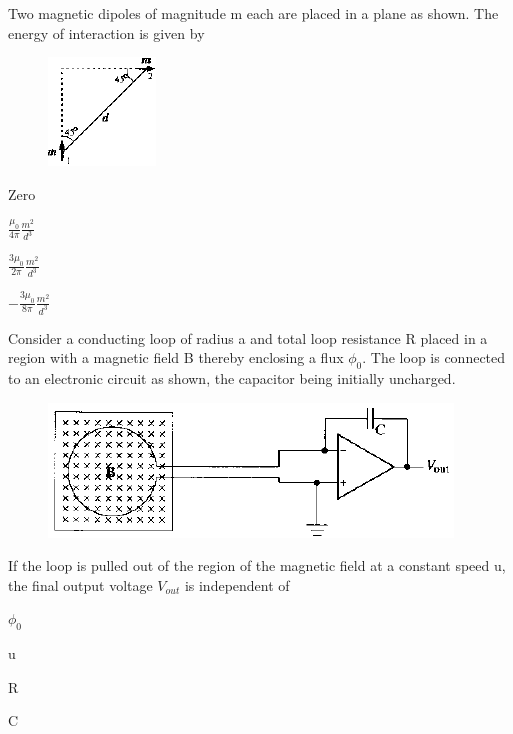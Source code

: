 \documentclass{exam}
\begin{document}
\begin{questions}
\question Two magnetic dipoles of magnitude m each are placed in a plane as shown. The energy of interaction is given by\hfill{}
	\begin{figure}[H] \centering
		\caption*{} \label{38} \includegraphics[width=0.1\columnwidth]{pics/38.png}
	\end{figure}


\begin{enumerate} \begin{multicols}{4}
	\item Zero \item $\frac{\mu_{0}}{4\pi}\frac{m^{2}}{d^{3}}$ \item $\frac{3\mu_{0}}{2\pi}\frac{m^{2}}{d^{3}}$ \item $-\frac{3\mu_{0}}{8\pi}\frac{m^{2}}{d^{3}}$
\end{multicols} \end{enumerate}

\question Consider a conducting loop of radius a and total loop resistance R placed in a region with a magnetic field B thereby enclosing a flux $\phi_0$. The loop is connected to an electronic circuit as shown, the capacitor being initially uncharged.
	\begin{figure}[H]
	\centering
		\caption*{} \label{39} \caption*{} \label{} \includegraphics[width=0.8\columnwidth]{pics/39.png}
	\end{figure}
	If the loop is pulled out of the region of the magnetic field at a constant speed u, the final output voltage $V_{out}$ is independent of\hfill{}


\begin{enumerate} \begin{multicols}{4}
	\item $\phi_0$ \item u \item R \item C
\end{multicols} \end{enumerate}


\end{questions}
\end{document}
